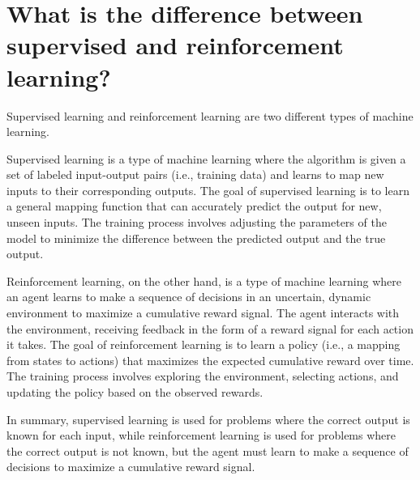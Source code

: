 \section{What is the difference between supervised and reinforcement learning?}
Supervised learning and reinforcement learning are two different types of machine learning.

Supervised learning is a type of machine learning where the algorithm is given a set of labeled input-output pairs (i.e., training data) and learns to map new inputs to their corresponding outputs. The goal of supervised learning is to learn a general mapping function that can accurately predict the output for new, unseen inputs. The training process involves adjusting the parameters of the model to minimize the difference between the predicted output and the true output.

Reinforcement learning, on the other hand, is a type of machine learning where an agent learns to make a sequence of decisions in an uncertain, dynamic environment to maximize a cumulative reward signal. The agent interacts with the environment, receiving feedback in the form of a reward signal for each action it takes. The goal of reinforcement learning is to learn a policy (i.e., a mapping from states to actions) that maximizes the expected cumulative reward over time. The training process involves exploring the environment, selecting actions, and updating the policy based on the observed rewards.

In summary, supervised learning is used for problems where the correct output is known for each input, while reinforcement learning is used for problems where the correct output is not known, but the agent must learn to make a sequence of decisions to maximize a cumulative reward signal.

